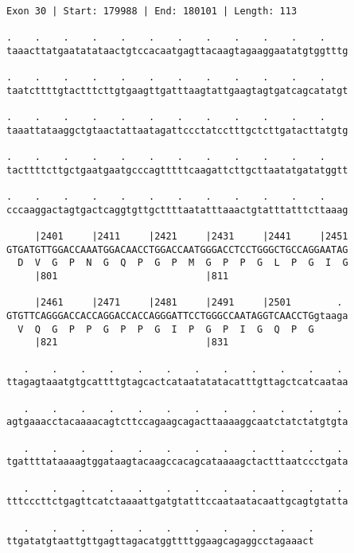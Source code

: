 \documentclass{article}
\begin{document}
\newpage
\begin{Verbatim}[fontfamily=courier]
Exon 30 | Start: 179988 | End: 180101 | Length: 113

.    .    .    .    .    .    .    .    .    .    .    .    
taaacttatgaatatataactgtccacaatgagttacaagtagaaggaatatgtggtttg

.    .    .    .    .    .    .    .    .    .    .    .    
taatcttttgtactttcttgtgaagttgatttaagtattgaagtagtgatcagcatatgt

.    .    .    .    .    .    .    .    .    .    .    .    
taaattataaggctgtaactattaatagattccctatcctttgctcttgatacttatgtg

.    .    .    .    .    .    .    .    .    .    .    .    
tacttttcttgctgaatgaatgcccagtttttcaagattcttgcttaatatgatatggtt

.    .    .    .    .    .    .    .    .    .    .    .    
cccaaggactagtgactcaggtgttgcttttaatatttaaactgtatttatttcttaaag

     |2401     |2411     |2421     |2431     |2441     |2451
GTGATGTTGGACCAAATGGACAACCTGGACCAATGGGACCTCCTGGGCTGCCAGGAATAG
  D  V  G  P  N  G  Q  P  G  P  M  G  P  P  G  L  P  G  I  G
     |801                          |811                     

     |2461     |2471     |2481     |2491     |2501        . 
GTGTTCAGGGACCACCAGGACCACCAGGGATTCCTGGGCCAATAGGTCAACCTGgtaaga
  V  Q  G  P  P  G  P  P  G  I  P  G  P  I  G  Q  P  G      
     |821                          |831                     

   .    .    .    .    .    .    .    .    .    .    .    . 
ttagagtaaatgtgcattttgtagcactcataatatatacatttgttagctcatcaataa

   .    .    .    .    .    .    .    .    .    .    .    . 
agtgaaacctacaaaacagtcttccagaagcagacttaaaaggcaatctatctatgtgta

   .    .    .    .    .    .    .    .    .    .    .    . 
tgattttataaaagtggataagtacaagccacagcataaaagctactttaatccctgata

   .    .    .    .    .    .    .    .    .    .    .    . 
tttcccttctgagttcatctaaaattgatgtatttccaataatacaattgcagtgtatta

   .    .    .    .    .    .    .    .    .    .    .
ttgatatgtaattgttgagttagacatggttttggaagcagaggcctagaaact
\end{Verbatim}
\newpage
\end{document}
